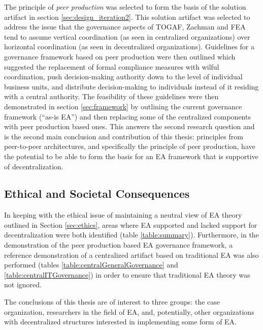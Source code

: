 The principle of \textit{peer production} was selected to form the basis of the solution artifact in section \ref{sec:design_iteration2}. This solution artifact was selected to address the issue that the governance aspects of TOGAF, Zachman and FEA tend to assume vertical coordination (as seen in centralized organizations) over horizontal coordination (as seen in decentralized organizations). Guidelines for a governance framework based on peer production were then outlined which suggested the replacement of formal compliance measures with wilful coordination, push decision-making authority down to the level of individual business units, and distribute decision-making to individuals instead of it residing with a central authority. The feasibility of these guidelines were then demonstrated in section \ref{sec:framework} by outlining the current governance framework (``as-is EA'') and then replacing some of the centralized components with peer production based ones. This answers the second research question and is the second main conclusion and contribution of this thesis: principles from peer-to-peer architectures, and specifically the principle of peer production, have the potential to be able to form the basis for an EA framework that is supportive of decentralization. 


\subsection{Ethical and Societal Consequences}
% 
% 
% 

In keeping with the ethical issue of maintaining a neutral view of EA theory outlined in Section \ref{sec:ethics}, areas where EA supported and lacked support for decentralization were both identified (table \ref{table:summary}). Furthermore, in the demonstration of the peer production based EA governance framework, a reference demonstration of a centralized artifact based on traditional EA was also performed (tables \ref{table:centralGeneralGovernance} and \ref{table:centralITGovernance}) in order to ensure that traditional EA theory was not ignored. 

The conclusions of this thesis are of interest to three groups: the case organization, researchers in the field of EA, and, potentially, other organizations with decentralized structures interested in implementing some form of EA. 

